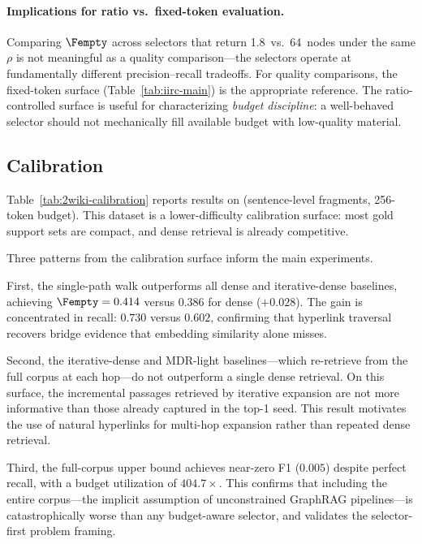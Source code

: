 \paragraph{Implications for ratio vs.\ fixed-token evaluation.}
Comparing $\Fempty$ across selectors that return 1.8~vs.\ 64~nodes
under the same $\rho$ is not meaningful as a quality comparison---the
selectors operate at fundamentally different precision--recall tradeoffs.
For quality comparisons, the fixed-token surface
(Table~\ref{tab:iirc-main}) is the appropriate reference.
The ratio-controlled surface is useful for characterizing \emph{budget
discipline}: a well-behaved selector should not mechanically fill
available budget with low-quality material.

\subsection{\TwoWiki Calibration}
\label{sec:results:2wiki}

Table~\ref{tab:2wiki-calibration} reports results on \TwoWiki (sentence-level
fragments, 256-token budget).
This dataset is a lower-difficulty calibration surface: most gold
support sets are compact, and dense retrieval is already competitive.



Three patterns from the calibration surface inform the main \IIRC experiments.

First, the single-path walk outperforms all dense and iterative-dense
baselines, achieving $\Fempty = 0.414$ versus $0.386$
for dense ($+0.028$).
The gain is concentrated in recall: $0.730$ versus $0.602$,
confirming that hyperlink traversal recovers bridge evidence that
embedding similarity alone misses.

Second, the iterative-dense and MDR-light baselines---which re-retrieve
from the full corpus at each hop---do not outperform a single dense
retrieval.
On this surface, the incremental passages retrieved by iterative expansion
are not more informative than those already captured in the top-1 seed.
This result motivates the use of natural hyperlinks for multi-hop expansion
rather than repeated dense retrieval.

Third, the full-corpus upper bound achieves near-zero F1 ($0.005$)
despite perfect recall, with a budget utilization of $404.7{\times}$.
This confirms that including the entire corpus---the implicit
assumption of unconstrained GraphRAG pipelines---is catastrophically
worse than any budget-aware selector, and validates the selector-first
problem framing.


